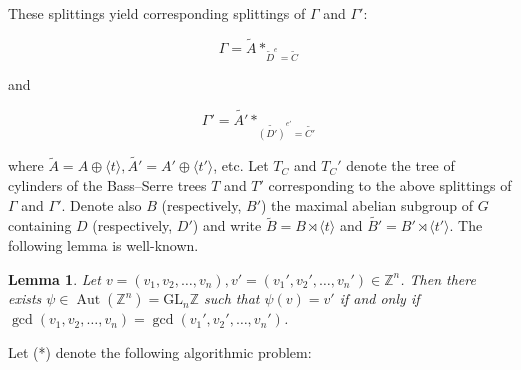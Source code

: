 \documentclass{amsart}
\newcommand{\Z}{\mathbb{Z}}
\DeclareMathOperator{\Aut}{Aut}
\theoremstyle{plain}
\newtheorem{lemma}[thm]{Lemma}
\theoremstyle{definition}
\theoremstyle{remark}
\begin{document}
These splittings yield corresponding splittings of $\Gamma$ and $\Gamma'$: 

$$\Gamma = \tilde{A}*_{\tilde{D}^e = \tilde{C}}$$

and 

$$\Gamma' = \tilde{A'}*_{\tilde{(D')}^{e'} = \tilde{C'}}$$

where $\tilde{A} = A \oplus \langle t \rangle, \tilde{A'} = A' \oplus \langle t' \rangle$, etc. Let $T_C$ and $T_C'$ denote the tree of cylinders of the Bass--Serre trees $T$ and $T'$ corresponding to the above splittings of $\Gamma$ and $\Gamma'$. Denote also $B$ (respectively, $B'$) the maximal abelian subgroup of $G$ containing $D$ (respectively, $D'$) and write $\tilde{B} = B \rtimes \langle t \rangle$ and $\tilde{B'} = B' \rtimes \langle t' \rangle$. The following lemma is well-known.

\begin{lemma}
    \label{lemma: Whitehead problem for fg free abelian groups}
    Let $v = (v_1,v_2, \ldots, v_n), v' = (v_1',v_2',\ldots,v_n') \in \Z^n$. Then there exists $\psi \in \Aut(\Z^n) = \mathrm{GL}_n \Z$ such that $\psi(v) = v'$ if and only if $\gcd(v_1,v_2,\ldots,v_n) = \gcd(v_1',v_2',\ldots,v_n')$. 
\end{lemma}

Let (*) denote the following algorithmic problem: 
\end{document}
